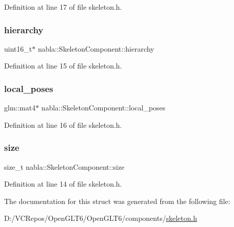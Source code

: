 Definition at line 17 of file skeleton.\+h.

\mbox{\label{structnabla_1_1_skeleton_component_a5664ecbfd1f97d8562214f68f828ee9d}} 
\subsubsection{\texorpdfstring{hierarchy}{hierarchy}}
{\footnotesize\ttfamily uint16\+\_\+t$\ast$ nabla\+::\+Skeleton\+Component\+::hierarchy}



Definition at line 15 of file skeleton.\+h.

\mbox{\label{structnabla_1_1_skeleton_component_abdfefff89b0414135c1ff87fbe9b390c}} 
\subsubsection{\texorpdfstring{local\_poses}{local\_poses}}
{\footnotesize\ttfamily glm\+::mat4$\ast$ nabla\+::\+Skeleton\+Component\+::local\+\_\+poses}



Definition at line 16 of file skeleton.\+h.

\mbox{\label{structnabla_1_1_skeleton_component_a5f113384ea68640232b3d2c303217993}} 
\subsubsection{\texorpdfstring{size}{size}}
{\footnotesize\ttfamily size\+\_\+t nabla\+::\+Skeleton\+Component\+::size}



Definition at line 14 of file skeleton.\+h.



The documentation for this struct was generated from the following file\+:\begin{DoxyCompactItemize}
\item 
D\+:/\+V\+C\+Repos/\+Open\+G\+L\+T6/\+Open\+G\+L\+T6/components/\mbox{\hyperlink{skeleton_8h}{skeleton.\+h}}\end{DoxyCompactItemize}
